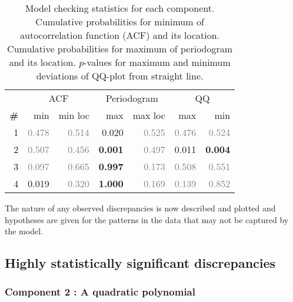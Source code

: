 \documentclass{article} %
\begin{document}
\begin{table}[htb]
\begin{center}
{\small
\begin{tabular}{|r|rr|rr|rr|}
\hline
 & \multicolumn{2}{|c|}{ACF} & \multicolumn{2}{|c|}{Periodogram} & \multicolumn{2}{|c|}{QQ} \\
\bf{\#} & {min} & {min loc} & {max} & {max loc} & {max} & {min}\\
\hline

1 & \textcolor{gray}{0.478} & \textcolor{gray}{0.514} & 0.020 & \textcolor{gray}{0.525} & \textcolor{gray}{0.476} & \textcolor{gray}{0.524}\\

2 & \textcolor{gray}{0.507} & \textcolor{gray}{0.456} & \textbf{0.001} & \textcolor{gray}{0.497} & 0.011 & \textbf{0.004}\\

3 & \textcolor{gray}{0.097} & \textcolor{gray}{0.665} & \textbf{0.997} & \textcolor{gray}{0.173} & \textcolor{gray}{0.508} & \textcolor{gray}{0.551}\\

4 & 0.019 & \textcolor{gray}{0.320} & \textbf{1.000} & \textcolor{gray}{0.169} & \textcolor{gray}{0.139} & \textcolor{gray}{0.852}\\

\hline
\end{tabular}
\caption{
Model checking statistics for each component.
Cumulative probabilities for minimum of autocorrelation function (ACF) and its location.
Cumulative probabilities for maximum of periodogram and its location.
$p$-values for maximum and minimum deviations of QQ-plot from straight line.
}
\label{table:check}
}
\end{center}
\end{table}

The nature of any observed discrepancies is now described and plotted and hypotheses are given for the patterns in the data that may not be captured by the model.

\subsection{Highly statistically significant discrepancies}

\subsubsection{Component 2 : A quadratic polynomial}
\end{document}
